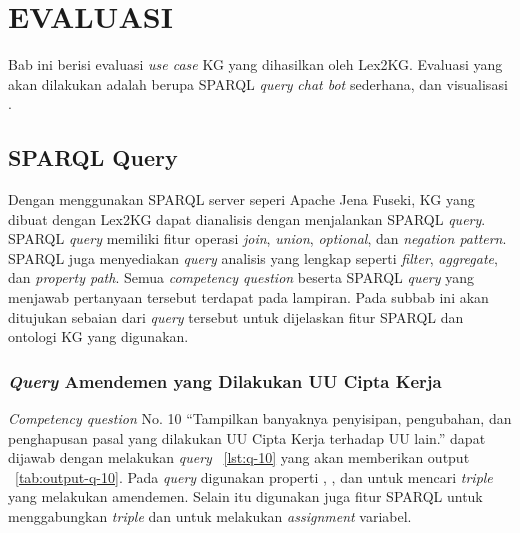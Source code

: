 \chapter{EVALUASI}
\label{chap:5}

Bab ini berisi evaluasi \textit{use case} KG yang dihasilkan oleh Lex2KG. Evaluasi yang akan
dilakukan adalah berupa SPARQL \textit{query} \textit{chat bot} sederhana, dan visualisasi \legal.

\section{SPARQL Query}
\label{sec:sparq-query}

Dengan menggunakan SPARQL server seperi Apache Jena Fuseki, KG yang dibuat dengan Lex2KG dapat
dianalisis dengan menjalankan SPARQL \textit{query}. SPARQL \textit{query} memiliki fitur operasi
\textit{join}, \textit{union}, \textit{optional}, dan \textit{negation pattern}. SPARQL juga
menyediakan \textit{query} analisis yang lengkap seperti \textit{filter}, \textit{aggregate}, dan
\textit{property path}. Semua \textit{competency question} beserta SPARQL \textit{query} yang
menjawab pertanyaan tersebut terdapat pada lampiran. Pada subbab ini akan ditujukan sebaian dari
\textit{query} tersebut untuk dijelaskan fitur SPARQL dan ontologi KG yang digunakan.

\subsection{\textit{Query} Amendemen yang Dilakukan UU Cipta Kerja}
\label{subsec:cq8}
\textit{Competency question} No. 10 ``Tampilkan banyaknya penyisipan, pengubahan, dan penghapusan
pasal yang dilakukan UU Cipta Kerja terhadap UU lain.'' dapat dijawab dengan melakukan
\textit{query} \lst~\ref{lst:q-10} yang akan memberikan output \tab~\ref{tab:output-q-10}. Pada
\textit{query} digunakan properti , , dan 
untuk mencari \textit{triple} yang melakukan amendemen. Selain itu digunakan juga fitur SPARQL
 untuk menggabungkan \textit{triple} dan  untuk melakukan \textit{assignment}
variabel.

